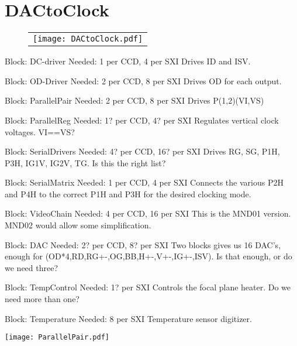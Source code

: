 \documentclass[a4paper,10pt]{report}
\begin{document}
\section{DACtoClock}

   \begin{figure}
   \begin{center}
   \begin{tabular}{c}
   \texttt{[image: DACtoClock.pdf]}
   \end{tabular}
   \end{center}
   \end{figure}


Block: DC-driver
Needed: 1 per CCD, 4 per SXI
Drives ID and ISV.

Block: OD-Driver
Needed: 2 per CCD, 8 per SXI
Drives OD for each output.

Block: ParallelPair
Needed: 2 per CCD, 8 per SXI
Drives P(1,2)(VI,VS)

Block: ParallelReg
Needed: 1? per CCD, 4? per SXI
Regulates vertical clock voltages. VI==VS?

Block: SerialDrivers
Needed: 4? per CCD, 16? per SXI
Drives RG, SG, P1H, P3H, IG1V, IG2V, TG. Is this the right list?

Block: SerialMatrix
Needed: 1 per CCD, 4 per SXI
Connects the various P2H and P4H to the correct P1H and P3H for the desired clocking mode.

Block: VideoChain
Needed: 4 per CCD, 16 per SXI
This is the MND01 version. MND02 would allow some simplification.

Block: DAC
Needed: 2? per CCD, 8? per SXI
Two blocks gives us 16 DAC's, enough for (OD*4,RD,RG+-,OG,BB,H+-,V+-,IG+-,ISV). Is that enough, or do we need three?


Block: TempControl
Needed: 1? per SXI
Controls the focal plane heater. Do we need more than one?

Block: Temperature
Needed: 8 per SXI
Temperature sensor digitizer.

\begin{center}
\texttt{[image: ParallelPair.pdf]}
\end{center}
\end{document}
